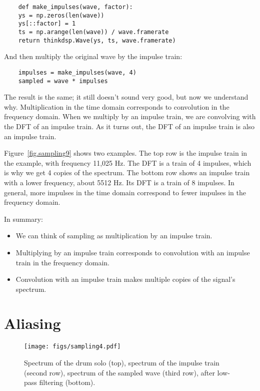 \begin{verbatim}
	def make_impulses(wave, factor):
	ys = np.zeros(len(wave))
	ys[::factor] = 1
	ts = np.arange(len(wave)) / wave.framerate
	return thinkdsp.Wave(ys, ts, wave.framerate)
\end{verbatim}

And then multiply the original wave by the impulse train:

\begin{verbatim}
	impulses = make_impulses(wave, 4)
	sampled = wave * impulses
\end{verbatim}

The result is the same; it still doesn't sound very good, but now
we understand why.  Multiplication in the time domain corresponds
to convolution in the frequency domain.  When we multiply
by an impulse train, we are convolving with the DFT of an
impulse train.  As it turns out, the DFT of an impulse
train is also an impulse train.

Figure~\ref{fig.sampling9} shows two examples.  The top row is
the impulse train in the example, with frequency 11,025 Hz.
The DFT is a train of 4 impulses, which is why we get 4 copies
of the spectrum.  The bottom row shows an impulse
train with a lower frequency, about 5512 Hz.  Its DFT is a train
of 8 impulses.  In general, more impulses in the time
domain correspond to fewer impulses in the frequency
domain.

In summary:

\begin{itemize}
	
	\item We can think of sampling as multiplication by an impulse train.
	
	\item Multiplying by an impulse train corresponds
	to convolution with an impulse train in the frequency domain.
	
	\item Convolution with an impulse train makes multiple copies of the
	signal's spectrum.
	
\end{itemize}


\section{Aliasing}

\begin{figure}
	\centerline{\texttt{[image: figs/sampling4.pdf]}}
	\caption{Spectrum of the drum solo (top), spectrum of the impulse
		train (second row), spectrum of the sampled wave (third row),
		after low-pass filtering (bottom).}
	\label{fig.sampling4}
\end{figure}

